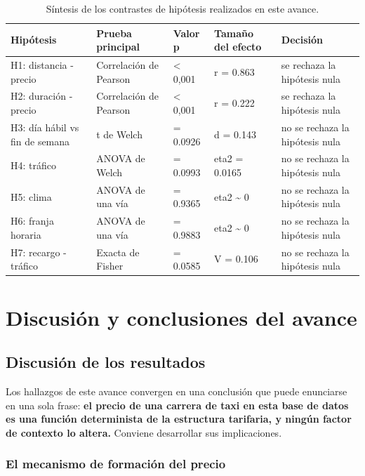 \documentclass[
]{book}
\begin{document}
\begin{table}

\caption{\label{tab:sintesis}Síntesis de los contrastes de hipótesis realizados en este avance.}
\centering
\begin{tabular}[t]{l|l|l|l|l}
\hline
Hipótesis & Prueba principal & Valor p & Tamaño del efecto & Decisión\\
\hline
H1: distancia - precio & Correlación de Pearson & < 0,001 & r = 0.863 & se rechaza la hipótesis nula\\
\hline
H2: duración - precio & Correlación de Pearson & < 0,001 & r = 0.222 & se rechaza la hipótesis nula\\
\hline
H3: día hábil vs fin de semana & t de Welch & = 0.0926 & d = 0.143 & no se rechaza la hipótesis nula\\
\hline
H4: tráfico & ANOVA de Welch & = 0.0993 & eta2 = 0.0165 & no se rechaza la hipótesis nula\\
\hline
H5: clima & ANOVA de una vía & = 0.9365 & eta2 \textasciitilde{} 0 & no se rechaza la hipótesis nula\\
\hline
H6: franja horaria & ANOVA de una vía & = 0.9883 & eta2 \textasciitilde{} 0 & no se rechaza la hipótesis nula\\
\hline
H7: recargo - tráfico & Exacta de Fisher & = 0.0585 & V = 0.106 & no se rechaza la hipótesis nula\\
\hline
\end{tabular}
\end{table}

\chapter{Discusión y conclusiones del avance}\label{discusion}

\section{Discusión de los resultados}\label{discusiuxf3n-de-los-resultados}

Los hallazgos de este avance convergen en una conclusión que puede enunciarse en una sola
frase: \textbf{el precio de una carrera de taxi en esta base de datos es una función determinista de
la estructura tarifaria, y ningún factor de contexto lo altera.} Conviene desarrollar sus
implicaciones.

\subsection{El mecanismo de formación del precio}\label{el-mecanismo-de-formaciuxf3n-del-precio}
\end{document}
